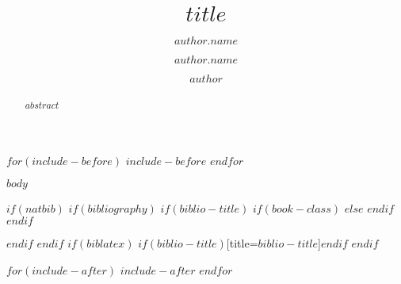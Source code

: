 \documentclass[$pubtype$,letterpaper]{ascelike-new}
\author[$author.number$]{$author.name$}
\author[]{$author.name$}
\affil{$author.affiliation$; Email: {$author.email$}}
\affil{$author.affiliation$}
\author{$author$}
\begin{document}
\title{\uppercase{$title$}}

\maketitle
$for(include-before)$
$include-before$
$endfor$
\begin{abstract}
$abstract$
\end{abstract}

$body$

$if(natbib)$
$if(bibliography)$
$if(biblio-title)$
$if(book-class)$
\renewcommand\bibname{$biblio-title$}
$else$
\renewcommand\refname{$biblio-title$}
$endif$
$endif$


$endif$
$endif$
$if(biblatex)$
\printbibliography$if(biblio-title)$[title=$biblio-title$]$endif$
$endif$

$for(include-after)$
$include-after$
$endfor$
%
\end{document}
